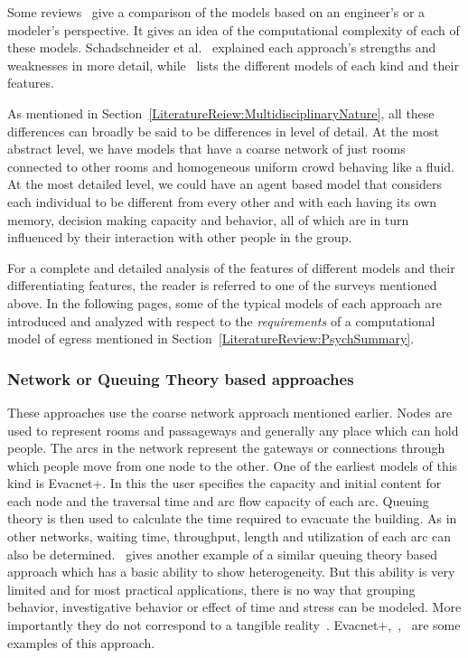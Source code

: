 Some reviews~\cite{Schadschneider:2008cz,Zheng:2009id} give a comparison of the models based on an engineer's or a modeler's perspective. It gives an idea of the computational complexity of each of these models. Schadschneider et al.~\cite{Schadschneider:2008cz} explained each approach's strengths and weaknesses in more detail, while~\cite{Zheng:2009id} lists the different models of each kind and their features.

As mentioned in Section~\ref{LiteratureReiew:MultidisciplinaryNature}, all these differences can broadly be said to be differences in level of detail. At the most abstract level, we have models that have a coarse network of just rooms connected to other rooms and homogeneous uniform crowd behaving like a fluid. At the most detailed level, we could have an agent based model that considers each individual to be different from every other and with each having its own memory, decision making capacity and behavior, all of which are in turn influenced by their interaction with other people in the group.

For a complete and detailed analysis of the features of different models and their differentiating features, the reader is referred to one of the surveys mentioned above. In the following pages, some of the typical models of each approach are introduced and analyzed with respect to the \emph{requirements} of a computational model of egress mentioned in Section~\ref{LiteratureReview:PsychSummary}.


\subsubsection{Network or Queuing Theory based approaches}

These approaches use the coarse network approach mentioned earlier. Nodes are used to represent rooms and passageways and generally any place which can hold people. The arcs in the network represent the gateways or connections through which people move from one node to the other.
One of the earliest models of this kind is Evacnet+. In this the user specifies the capacity and initial content for each node and the traversal time and arc flow capacity of each arc. Queuing theory is then used to calculate the time required to evacuate the building. As in other networks, waiting time, throughput, length and utilization of each arc can also be determined.~\cite{Lammel:2009dj} gives another example of a similar queuing theory based approach which has a basic ability to show heterogeneity. But this ability is very limited and for most practical applications, there is no way that grouping behavior, investigative behavior or effect of time and stress can be modeled. More importantly they do not correspond to a tangible reality~\cite{Bierlaire:2003uj}. Evacnet+,~\cite{Lino:2009td},~\cite{Lammel:2009dj} are some examples of this approach.

